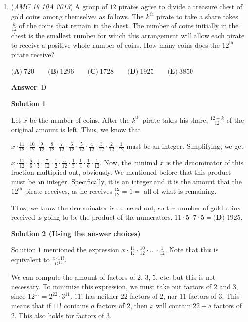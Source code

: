 \begin{enumerate}
 


	\item (\textit{AMC 10 10A 2013}) A group of $12$ pirates agree to divide a treasure chest of gold coins among themselves as follows.  The $k^{\text{th}}$ pirate to take a share takes $\frac{k}{12}$ of the coins that remain in the chest.  The number of coins initially in the chest is the smallest number for which this arrangement will allow each pirate to receive a positive whole number of coins.  How many coins does the $12^{\text{th}}$ pirate receive?


 $\textbf{(A)}\ 720\qquad\textbf{(B)}\ 1296\qquad\textbf{(C)}\ 1728\qquad\textbf{(D)}\ 1925\qquad\textbf{(E)}\ 3850$

 \textbf{Answer: }D



\textbf{Solution 1}

Let $x$ be the number of coins.  After the $k^{\text{th}}$ pirate takes his share, $\frac{12-k}{12}$ of the original amount is left.  Thus, we know that

 $x \cdot \frac{11}{12} \cdot \frac{10}{12} \cdot \frac{9}{12} \cdot \frac{8}{12} \cdot \frac{7}{12} \cdot \frac{6}{12} \cdot \frac{5}{12} \cdot \frac{4}{12} \cdot \frac{3}{12} \cdot \frac{2}{12} \cdot \frac{1}{12}$ must be an integer.  Simplifying, we get

 
$x \cdot \frac{11}{12} \cdot \frac{5}{6} \cdot \frac{1}{2}  \cdot \frac{7}{12} \cdot \frac{1}{2} \cdot \frac{5}{12} \cdot \frac{1}{3} \cdot \frac{1}{4} \cdot \frac{1}{6} \cdot \frac{1}{12}$.  Now, the minimal $x$ is the denominator of this fraction multiplied out, obviously.  We mentioned before that this product must be an integer.  Specifically, it is an integer and it is the amount that the $12^{\text{th}}$ pirate receives, as he receives $\frac{12}{12} = 1 =$ all of what is remaining.  

 Thus, we know the denominator is canceled out, so the number of gold coins received is going to be the product of the numerators, $11 \cdot 5 \cdot 7 \cdot 5 = \boxed{\textbf{(D) }1925}$.

 



\textbf{Solution 2 (Using the answer choices)}

Solution $1$ mentioned the expression $x \cdot \frac{11}{12} \cdot \frac{10}{12} \cdot ... \cdot \frac{1}{12}$. Note that this is equivalent to $\frac{x \cdot 11!}{12^{11}}$. 

 
We can compute the amount of factors of $2$, $3$, $5$, etc. but this is not necessary. To minimize this expression, we must take out factors of $2$ and $3$, since $12^{11}=2^{22} \cdot 3^{11}$. $11!$ has neither $22$ factors of $2$, nor $11$ factors of $3$. This means that if $11!$ contains $a$ factors of $2$, then $x$ will contain $22-a$ factors of $2$. This also holds for factors of $3$.


\end{enumerate}
